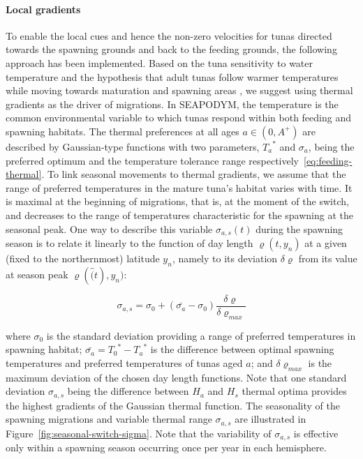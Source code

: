 \paragraph{Local gradients} To enable the local cues and hence the non-zero velocities for tunas directed towards the spawning grounds and back to the feeding grounds, the following approach has been implemented. Based on the tuna sensitivity to water temperature and the hypothesis that adult tunas follow warmer temperatures while moving towards maturation and spawning areas \citep{LeGall}, we suggest using thermal gradients as the driver of migrations. In SEAPODYM, the temperature is the common environmental variable to which tunas respond within both feeding and spawning habitats. The thermal preferences at all ages $a \in (0,A^{+})$ are described by Gaussian-type functions with two parameters, ${T_a}^*$ and $\sigma_a$, being the preferred optimum and the temperature tolerance range respectively~\eqref{eq:feeding-thermal}. To link seasonal movements to thermal gradients, we assume that the range of preferred temperatures in the mature tuna’s habitat varies with time. It is maximal at the beginning of migrations, that is, at the moment of the switch, and decreases to the range of temperatures characteristic for the spawning at the seasonal peak. One way to describe this variable $\sigma_{a,s}(t)$ during the spawning season is to relate it linearly to the function of day length $\varrho(t,y_n)$ at a given (fixed to the northernmost) latitude $y_n$, namely to its deviation $\delta \varrho$ from its value at season peak $\varrho (\hat(t),y_n)$:

\begin{equation}
  \sigma_{a,s}=\sigma_0+\left(\bar{\sigma_a}-\sigma_0\right) \frac{\delta \varrho}{\delta \varrho_{max}} 
\label{eq:var-sigma}
\end{equation}

\noindent where $\sigma_0$ is the standard deviation providing a range of preferred temperatures in spawning habitat; $\bar{\sigma_a}={T_0}^*-{T_a}^*$ is the difference between optimal spawning temperatures and preferred temperatures of tunas aged $a$; and $\delta \varrho_{max}$ is the maximum deviation of the chosen day length functions. Note that one standard deviation $\sigma_{a,s}$ being the difference between $H_a$ and $H_s$ thermal optima provides the highest gradients of the Gaussian thermal function. The seasonality of the spawning migrations and variable thermal range $\sigma_{a,s}$ are illustrated in Figure~\ref{fig:seasonal-switch-sigma}. Note that the variability of $\sigma_{a,s}$ is effective only within a spawning season occurring once per year in each hemisphere. 



